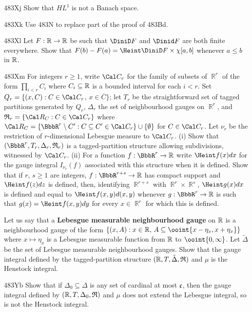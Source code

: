 {\spheader 483Xj Show that $HL^1$ is not a Banach space.   

\sqheader 483Xk Use 483N to replace part of the proof of 483Bd.

\spheader 483Xl Let $F:\Bbb R\to\Bbb R$ be such that $\DiniD F$ and $\Dinid F$
are both finite everywhere.   Show that
$F(b)-F(a)=\Heint\DiniD F\times\chi[a,b]$ whenever $a\le b$ in $\Bbb R$.

\spheader 483Xm
For integers $r\ge 1$, write $\Cal C_r$ for the family of
subsets of $\BbbR^r$ of the form $\prod_{i<r}C_i$ where 
$C_i\subseteq\Bbb R$ is a bounded interval for each $i<r$.   Set
$Q_r=\{(x,C):C\in\Cal C_r$, $x\in\overline{C}\}$;  let $T_r$ be the
straightforward set of tagged partitions generated by $Q_r$, 
$\Delta_r$ the set
of neighbourhood gauges on $\BbbR^r$, and 
$\frak R_r=\{\Cal R_C:C\in\Cal C_r\}$
where $\Cal R_C
=\{\BbbR^r\setminus C':C\subseteq C'\in\Cal C_r\}\cup\{\emptyset\}$ for 
$C\in\Cal C_r$.   Let $\nu_r$ be the restriction of $r$-dimensional
Lebesgue measure to $\Cal C_r$.   
(i) Show that $(\BbbR^r,T_r,\Delta_r,\frak R_r)$ is
a tagged-partition structure allowing subdivisions, witnessed by 
$\Cal C_r$.   (ii) For a function $f:\BbbR^r\to\Bbb R$ write 
$\Heint f(x)dx$ for the gauge integral $I_{\nu_r}(f)$ associated with this
structure when it is defined.   Show that if $r$, $s\ge 1$ are integers,
$f:\BbbR^{r+s}\to\Bbb R$ has compact support and $\Heint f(z)dz$ is
defined, then, identifying $\BbbR^{r+s}$ with $\BbbR^r\times\BbbR^s$,
$\Heint g(x)dx$ is defined and equal to $\Heint f(x,y)d(x,y)$ whenever
$g:\BbbR^r\to\Bbb R$ is such that $g(x)=\Heint f(x,y)dy$ for every
$x\in\BbbR^r$ for which this is defined.   

Let us say that a {\bf Lebesgue measurable neighbourhood
gauge} on $\Bbb R$ is a neighbourhood gauge of the form
$\{(x,A):x\in\Bbb R,\,A\subseteq\ooint{x-\eta_x,x+\eta_x}\}$ where
$x\mapsto\eta_x$ is a Lebesgue measurable function from $\Bbb R$ to
$\ooint{0,\infty}$.   Let $\tilde\Delta$ be the set of Lebesgue
measurable neighbourhood gauges.   Show that the gauge integral defined
by the tagged-partition structure $(\Bbb R,T,\tilde\Delta,\frak R)$ and
$\mu$ is the Henstock integral.

\spheader 483Yb Show that if $\Delta_0\subseteq\Delta$ is any set of
cardinal at most $\frak c$, then the gauge integral defined by
$(\Bbb R,T,\Delta_0,\frak R)$ and $\mu$ does not extend the Lebesgue
integral, so is not the Henstock integral.

}

